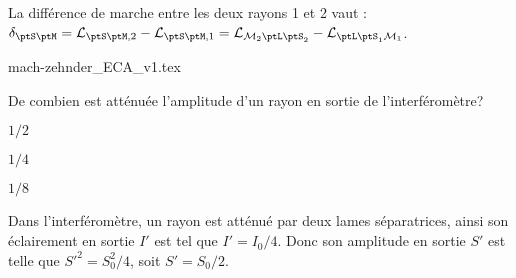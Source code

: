 La différence de marche entre les deux rayons 1 et 2 vaut : $\delta_{\ptS \ptM}=\mathcal{L}_{\ptS\ptM,2}-\mathcal{L}_{\ptS\ptM,1}=\mathcal{L}_{\mathcal{M}_2 \ptL\ptS_2} - \mathcal{L}_{\ptL\ptS_1 \mathcal{M}_1}$.

\initialisationPartieDroite %
\begin{center}
	{mach-zehnder_ECA_v1.tex}
\end{center}
\finalisationDuPartageDePage %


\debutEntrainement

\clearpage


\begin{enonce}
	De combien est atténuée l'amplitude d'un rayon en sortie de l'interféromètre?
	\begin{listeQCM3Colonnes}
		\item $1/2$
		\item $1/4$
		\item $1/8$
		\end{listeQCM3Colonnes}
\end{enonce}
	
	\reponse{\reponseB{}}
	
	\begin{corrige}
		Dans l'interféromètre, un rayon est atténué par deux lames séparatrices, ainsi son éclairement en sortie $I'$ est tel que $I' = I_0/4$. Donc son amplitude en sortie $S'$ est telle que $S'^2 = S^2_0/4$, soit $S' = S_0/2$.
	\end{corrige}
	


